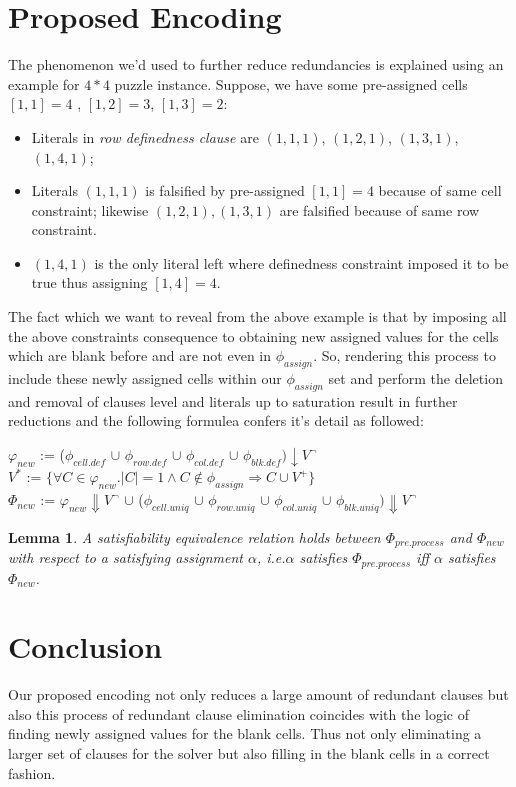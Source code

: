 \documentclass[letterpaper]{article}
\newtheorem{lemma}[definition]{Lemma}
\begin{document}
\section{Proposed Encoding}
\noindent The phenomenon we'd used to further reduce redundancies is explained using an example for $4\ast4$ puzzle instance. Suppose, we have some pre-assigned cells $[1,1]=4$ , $[1,2]=3$, $[1,3]=2$:
\begin{itemize}
\item Literals in  \textit{row definedness clause} are $(1,1,1)$, $(1,2,1)$, $(1,3,1)$, $(1,4,1)$;
\item Literals $(1,1,1)$ is falsified by pre-assigned $[1,1]=4$ because of same cell constraint; likewise $(1,2,1),(1,3,1)$ are falsified because of same row constraint.
\item $(1,4,1)$ is the only literal left where definedness constraint imposed it to be true thus assigning $[1,4]=4$.
\end{itemize}

The fact which we want to reveal from the above example is that by imposing all the above constraints consequence to obtaining new assigned values for the cells which are blank before and are not even in $\phi_{assign}$. So, rendering this process to include these newly assigned cells within our $\phi_{assign}$ set and perform the deletion and removal of clauses level and literals up to saturation result in further reductions and the following formulea confers it's detail as followed: 

$\varphi_{new}$ := ($\phi_{cell.def}$ $\cup$ $\phi_{row.def}$ $\cup$ $\phi_{col.def}$ $\cup$ $\phi_{blk.def})\downarrow V^{\neg}$\\
$V^{*}$ := $\{ \forall C \in \varphi_{new} . |C| = 1 \wedge C \not\in \phi_{assign} \Rightarrow C \cup V^{+} \}$\\
$\Phi_{new}$ := $\varphi_{new}\Downarrow V^{\neg}$ $\cup$
($\phi_{cell.uniq}$ $\cup$ $\phi_{row.uniq}$ $\cup$ $\phi_{col.uniq}$ $\cup$ $\phi_{blk.uniq})\Downarrow V^{\neg}$\\

\begin{lemma}
\label{lemma:Satisfiablity}
A satisfiability equivalence relation holds between $\Phi_{pre.process}$ and $\Phi_{new}$ with respect to a satisfying assignment $\alpha$, i.e.$\alpha$ satisfies $\Phi_{pre.process}$ iff $\alpha$ satisfies $\Phi_{new}$.
\end{lemma}

\section{Conclusion}
Our proposed encoding not only reduces a large amount of redundant clauses but also this process of redundant clause elimination coincides with the logic of finding newly assigned values for the blank cells. Thus not only eliminating a larger set of clauses for the solver but also filling in the blank cells in a correct fashion.



\end{document}
